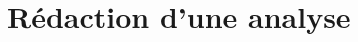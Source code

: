 \chapter{Rédaction d'une analyse}\hypertarget{rdaction-dune-analyse}{}\label{rdaction-dune-analyse}

